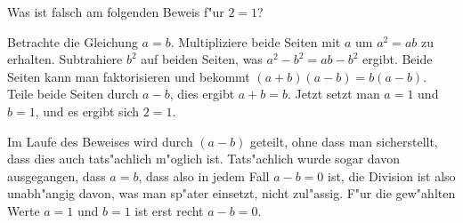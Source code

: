 Was ist falsch am folgenden Beweis f"ur $2=1$?

Betrachte die Gleichung $a=b$. Multipliziere beide Seiten mit
$a$ um $a^2=ab$ zu erhalten. Subtrahiere $b^2$ auf beiden
Seiten, was $a^2-b^2=ab-b^2$ ergibt. Beide Seiten kann man
faktorisieren und bekommt $(a+b)(a-b)=b(a-b)$. Teile beide
Seiten durch $a-b$, dies ergibt $a+b=b$. Jetzt setzt man
$a=1$ und $b=1$, und es ergibt sich $2=1$.

\begin{loesung}
Im Laufe des Beweises wird durch $(a-b)$ geteilt, ohne dass man
sicherstellt, dass dies auch tats"achlich m"oglich ist.
Tats"achlich wurde sogar davon ausgegangen, dass $a=b$, dass
also in jedem Fall $a-b=0$ ist, die Division ist also unabh"angig davon,
was man sp"ater einsetzt, nicht zul"assig.
F"ur die
gew"ahlten Werte $a=1$ und $b=1$  ist erst recht $a-b=0$.
\end{loesung}

